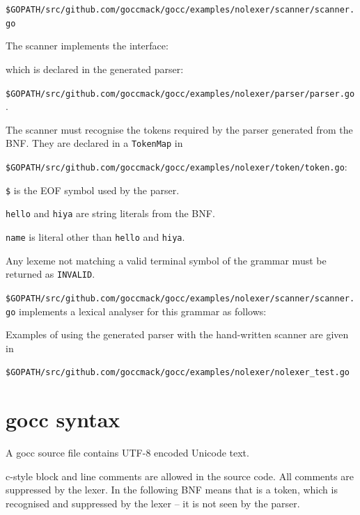 \documentclass[12pt]{article}
\begin{document}
    \verb|$GOPATH/src/github.com/goccmack/gocc/examples/nolexer/scanner/scanner.go|

    The scanner implements the interface:

    

    which is declared in the generated parser:

    \verb|$GOPATH/src/github.com/goccmack/gocc/examples/nolexer/parser/parser.go|.

    The scanner must recognise the tokens required by the parser generated from the BNF. They are declared in a \verb|TokenMap| in

    \verb|$GOPATH/src/github.com/goccmack/gocc/examples/nolexer/token/token.go|:

    

    \verb|$| is the EOF symbol used by the parser.

    \verb|hello| and \verb|hiya| are string literals from the BNF.

    \verb|name| is literal other than \verb|hello| and \verb|hiya|.

    Any lexeme not matching a valid terminal symbol of the grammar must be returned as \verb|INVALID|.

    \verb|$GOPATH/src/github.com/goccmack/gocc/examples/nolexer/scanner/scanner.go| implements a lexical analyser for this grammar as follows:

    

    Examples of using the generated parser with the hand-written scanner are given in

    \verb|$GOPATH/src/github.com/goccmack/gocc/examples/nolexer/nolexer_test.go|

\section{gocc syntax}\label{sec:gocc syntax}
	A gocc source file contains UTF-8 encoded Unicode text.

	c-style block and line comments are allowed in the source code. All comments are suppressed by the lexer.
	In the following BNF  means that  is a token, which is recognised and suppressed by the lexer -- it is not seen by the parser.
\end{document}
